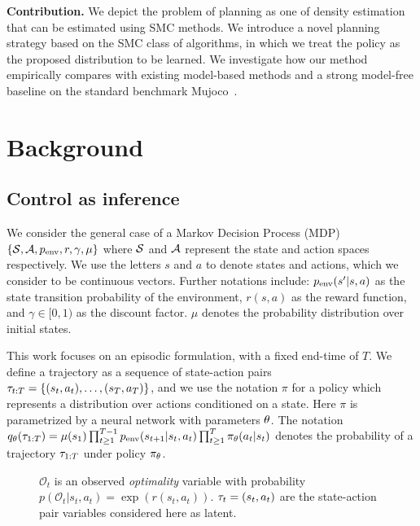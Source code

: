 \textbf{Contribution.} We depict the problem of planning as one of density estimation that can be estimated using SMC methods. We introduce a novel planning strategy based on the SMC class of algorithms, in which we treat the policy as the proposed distribution to be learned. We investigate how our method empirically compares with existing model-based methods and a strong model-free baseline on the standard benchmark Mujoco~\citep{todorov2012mujoco}. 


\section{Background}
\subsection{Control as inference}
\label{sec:control_as_inference}

We consider the general case of a Markov Decision Process (MDP) $\{{\mathcal{S}}, {\mathcal{A}}, p_{\text{env}}, r, \gamma, \mu\}$ where ${\mathcal{S}}$ and ${\mathcal{A}}$ represent the state and action spaces respectively. We use the letters $s$ and $a$ to denote states and actions, which we consider to be continuous vectors. Further notations include: $p_{\text{env}}(s' |s, a)$ as the state transition probability of the environment, $r(s, a)$ %
as the reward function, and $\gamma \in [0, 1)$ as the discount factor. $\mu$ denotes the probability distribution over initial states.

This work focuses on an episodic formulation, with a fixed end-time of $T$. We define a trajectory as a sequence of state-action pairs $\tau_{t:T}=\{(s_t,a_t), \ldots,(s_T, a_T) \}$, and we use the notation $\pi$ for a policy which represents a distribution over actions conditioned on a state. Here $\pi$ is parametrized by a neural network with parameters $\theta$. The notation %
$q_\theta(\tau_{1:T}) = \mu(s_1) \prod_{t \geq 1}^{T-1} p_{\text{env}}(s_{t+1}|s_t, a_t) \prod_{t \geq 1}^{T} \pi_\theta(a_t|s_t)$
denotes the probability of a trajectory $\tau_{1:T}$ under policy $\pi_\theta$. 


\setlength{\wrapoverhang}{\marginparwidth}
\addtolength{\wrapoverhang}{\marginparsep}
\begin{figure}%
\centering
\resizebox{.95\linewidth}{!}{

}
\caption{$\mathcal{O}_t$ is an observed \textit{optimality} variable with probability $p(\mathcal{O}_t|s_t, a_t) = \exp(r(s_t,a_t))$. $\tau_t = (s_t, a_t)$ are the state-action pair variables considered here as latent.}
\label{fig:graphical_model}
\end{figure}

